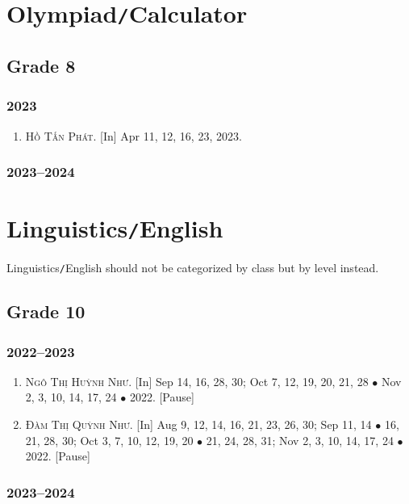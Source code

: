 \documentclass{article}
\begin{document}
\section{Olympiad\texttt{/}Calculator}

\subsection{Grade 8}

\subsubsection{2023}

\begin{enumerate}
	\item \textsc{Hồ Tấn Phát.} \textsf{[In]} Apr 11, 12, 16, 23, 2023.
\end{enumerate}

\subsubsection{2023--2024}


\section{Linguistics\texttt{/}English}
Linguistics\texttt{/}English should not be categorized by class but by level instead.

\subsection{Grade 10}

\subsubsection{2022--2023}

\begin{enumerate}
	\item \textsc{Ngô Thị Huỳnh Như.} \textsf{[In]} Sep 14, 16, 28, 30; Oct 7, 12, 19, 20, 21, 28 $\bullet$ Nov 2, 3, 10, 14, 17, 24 $\bullet$ 2022. \textsf{[Pause]}
	\item \textsc{Đàm Thị Quỳnh Như.} \textsf{[In]} Aug 9, 12, 14, 16, 21, 23, 26, 30; Sep 11, 14 $\bullet$ 16, 21, 28, 30; Oct 3, 7, 10, 12, 19, 20 $\bullet$ 21, 24, 28, 31; Nov 2, 3, 10, 14, 17, 24 $\bullet$ 2022. \textsf{[Pause]}
\end{enumerate}

\subsubsection{2023--2024}


\printbibliography[heading=bibintoc]
	
\end{document}
